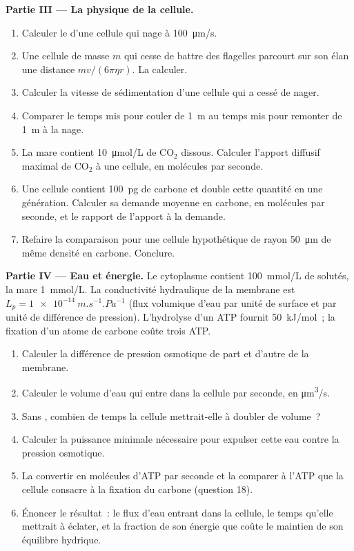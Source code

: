 \begin{problem}
\medskip
\noindent\textbf{Partie III --- La physique de la cellule.}
\begin{enumerate}[resume]
  \item Calculer le  d'une cellule qui nage à
        \qty{100}{\micro m/s}.
  \item Une cellule de masse $m$ qui cesse de battre des flagelles
        parcourt sur son élan une distance $mv/(6\pi\eta r)$. La
        calculer.
  \item Calculer la vitesse de sédimentation d'une cellule qui a cessé
        de nager.
  \item Comparer le temps mis pour couler de \qty{1}{m} au temps mis
        pour remonter de \qty{1}{m} à la nage.
  \item La mare contient \qty{10}{\micro mol/L} de $\mathrm{CO_2}$
        dissous. Calculer l'apport diffusif maximal de
        $\mathrm{CO_2}$ à une cellule, en molécules par seconde.
  \item Une cellule contient \qty{100}{pg} de carbone et double cette
        quantité en une génération. Calculer sa demande moyenne en
        carbone, en molécules par seconde, et le rapport de l'apport à la
        demande.
  \item Refaire la comparaison pour une cellule hypothétique de rayon
        \qty{50}{\micro m} de même densité en carbone. Conclure.
\end{enumerate}

\medskip
\noindent\textbf{Partie IV --- Eau et énergie.}
Le cytoplasme contient \qty{100}{mmol/L} de solutés, la mare
\qty{1}{mmol/L}. La conductivité hydraulique de la membrane est $L_p =
\qty{1e-14}{m.s^{-1}.Pa^{-1}}$ (flux volumique d'eau par unité de
surface et par unité de différence de pression). L'hydrolyse d'un ATP
fournit \qty{50}{kJ/mol}~; la fixation d'un atome de carbone coûte
trois ATP.
\begin{enumerate}[resume]
  \item Calculer la différence de pression osmotique de part et d'autre
        de la membrane.
  \item Calculer le volume d'eau qui entre dans la cellule par seconde,
        en \unit{\micro m^3/s}.
  \item Sans , combien de temps la cellule
        mettrait-elle à doubler de volume~?
  \item Calculer la puissance minimale nécessaire pour expulser cette
        eau contre la pression osmotique.
  \item La convertir en molécules d'ATP par seconde et la comparer à
        l'ATP que la cellule consacre à la fixation du carbone
        (question 18).
  \item Énoncer le résultat~: le flux d'eau entrant dans la cellule, le
        temps qu'elle mettrait à éclater, et la fraction de son énergie
        que coûte le maintien de son équilibre hydrique.
\end{enumerate}
\end{problem}
